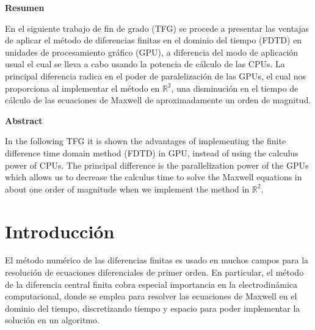 \documentclass[11pt,a4paper,twoside,pdf]{article}
\numberwithin{equation}{section}
\begin{document}
\begin{center}

{\bf Resumen}
\bigskip

\begin{minipage}{0.8\linewidth}
En el siguiente trabajo de fin de grado (TFG) se procede a presentar las ventajas de aplicar el método de diferencias finitas en el dominio del tiempo (FDTD) en unidades de procesamiento gráfico (GPU), a diferencia del modo de aplicación usual el cual se lleva a cabo usando la potencia de cálculo de las CPUs. La principal diferencia radica en el poder de paralelización de las GPUs, el cual nos proporciona al implementar el método en $\mathbb R^{2}$, una disminución en el tiempo de cálculo de las ecuaciones de Maxwell de aproximadamente un orden de magnitud.

\end{minipage}

\vfill

{\bf Abstract} 
\bigskip

\begin{minipage}{0.8\linewidth}
In the following TFG it is shown the advantages of implementing the finite difference time domain method (FDTD) in GPU, instead of using the calculus power of CPUs. The principal difference is the parallelization power of the GPUs which allows us to decrease the calculus time to solve the Maxwell equations in about one order of magnitude when we implement the method in $\mathbb R^{2}$.
\end{minipage}

\vfill

\end{center}

\newpage

\tableofcontents

\newpage

\pagestyle{fancy}
\fancyhead[RO,LE]{\leftmark}
\fancyhead[LO,RE]{\thepage}
\fancyfoot{}

\section{Introducción}
El método numérico de las diferencias finitas es usado en muchos campos para la resolución de ecuaciones diferenciales de primer orden. En particular, el método de la diferencia central finita cobra especial importancia en la electrodinámica computacional, donde se emplea para resolver las ecuaciones de Maxwell en el dominio del tiempo, discretizando tiempo y espacio para poder implementar la solución en un algoritmo.
\end{document}
